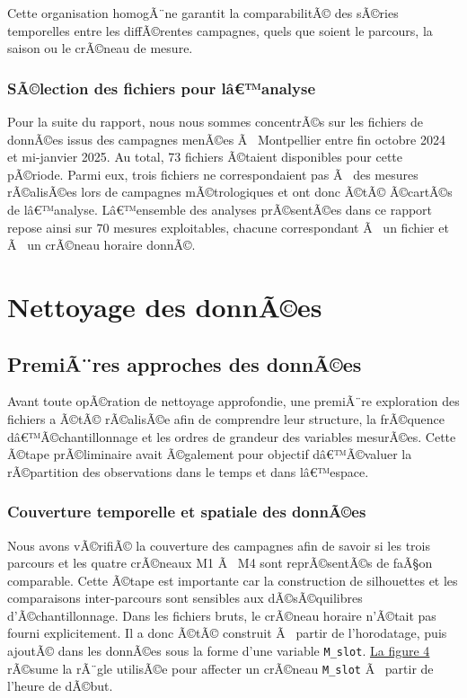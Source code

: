 \documentclass{article}
\begin{document}
Cette organisation homogÃ¨ne garantit la comparabilitÃ© des sÃ©ries temporelles entre les diffÃ©rentes campagnes, quels que soient le parcours, la saison ou le crÃ©neau de mesure.

\subsubsection{SÃ©lection des fichiers pour lâ€™analyse}

Pour la suite du rapport, nous nous sommes concentrÃ©s sur les fichiers de donnÃ©es issus des campagnes menÃ©es Ã  Montpellier entre fin octobre 2024 et mi-janvier 2025. Au total, 73 fichiers Ã©taient disponibles pour cette pÃ©riode. Parmi eux, trois fichiers ne correspondaient pas Ã  des mesures rÃ©alisÃ©es lors de campagnes mÃ©trologiques et ont donc Ã©tÃ© Ã©cartÃ©s de lâ€™analyse. Lâ€™ensemble des analyses prÃ©sentÃ©es dans ce rapport repose ainsi sur 70 mesures exploitables, chacune correspondant Ã  un fichier et Ã  un crÃ©neau horaire donnÃ©.

\newpage


\section{Nettoyage des donnÃ©es}
\label{sec:travaux_realises}

\subsection{PremiÃ¨res approches des donnÃ©es}

Avant toute opÃ©ration de nettoyage approfondie, une premiÃ¨re exploration des fichiers a Ã©tÃ© rÃ©alisÃ©e afin de comprendre leur structure, la frÃ©quence dâ€™Ã©chantillonnage et les ordres de grandeur des variables mesurÃ©es. Cette Ã©tape prÃ©liminaire avait Ã©galement pour objectif dâ€™Ã©valuer la rÃ©partition des observations dans le temps et dans lâ€™espace.

\subsubsection{Couverture temporelle et spatiale des donnÃ©es}

Nous avons vÃ©rifiÃ© la couverture des campagnes afin de savoir si les trois parcours et les quatre crÃ©neaux M1 Ã  M4 sont reprÃ©sentÃ©s de faÃ§on comparable. Cette Ã©tape est importante car la construction de silhouettes et les comparaisons inter-parcours sont sensibles aux dÃ©sÃ©quilibres d'Ã©chantillonnage. Dans les fichiers bruts, le crÃ©neau horaire n'Ã©tait pas fourni explicitement. Il a donc Ã©tÃ© construit Ã  partir de l'horodatage, puis ajoutÃ© dans les donnÃ©es sous la forme d'une variable \texttt{M\_slot}. \hyperref[fig:regle_mslot]{La figure 4} rÃ©sume la rÃ¨gle utilisÃ©e pour affecter un crÃ©neau \texttt{M\_slot} Ã  partir de l'heure de dÃ©but.
\end{document}
